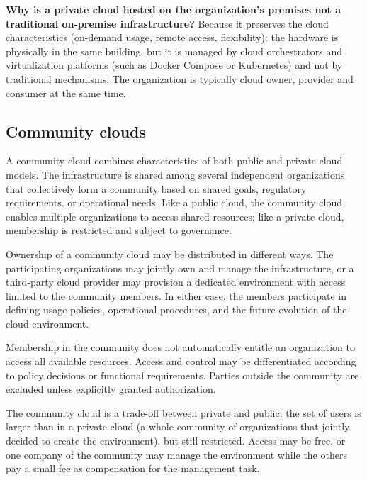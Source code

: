 \textbf{Why is a private cloud hosted on the organization's premises not a traditional on-premise infrastructure?} Because it preserves the cloud characteristics (on-demand usage, remote access, flexibility): the hardware is physically in the same building, but it is managed by cloud orchestrators and virtualization platforms (such as Docker Compose or Kubernetes) and not by traditional mechanisms. The organization is typically cloud owner, provider and consumer at the same time.

\begin{center}
\end{center}

\subsection{Community clouds}

A community cloud combines characteristics of both public and private cloud models. The infrastructure is shared among several independent organizations that collectively form a community based on shared goals, regulatory requirements, or operational needs. Like a public cloud, the community cloud enables multiple organizations to access shared resources; like a private cloud, membership is restricted and subject to governance.

Ownership of a community cloud may be distributed in different ways. The participating organizations may jointly own and manage the infrastructure, or a third-party cloud provider may provision a dedicated environment with access limited to the community members. In either case, the members participate in defining usage policies, operational procedures, and the future evolution of the cloud environment.

Membership in the community does not automatically entitle an organization to access all available resources. Access and control may be differentiated according to policy decisions or functional requirements. Parties outside the community are excluded unless explicitly granted authorization.

The community cloud is a trade-off between private and public: the set of users is larger than in a private cloud (a whole community of organizations that jointly decided to create the environment), but still restricted. Access may be free, or one company of the community may manage the environment while the others pay a small fee as compensation for the management task.

